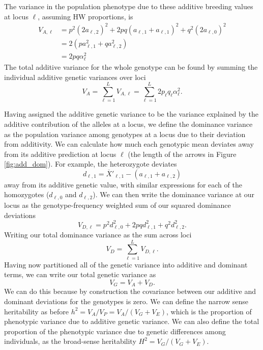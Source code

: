 The variance in the population phenotype due to these
additive breeding values at locus $\ell$, assuming HW proportions, is
\begin{align}
V_{A, \ell} &= p^2 (2a_{\ell,2})^2 + 2pq (a_{\ell,1}+a_{\ell,1})^2 + q^2
(2a_{\ell,0})^2 \nonumber \\
& = 2(p a_{\ell, 1}^2 + q a_{\ell, 2}^2 ) \nonumber \\
& = 2pq \alpha_{\ell}^2
\end{align}
The total additive variance for the whole genotype can
be found by summing the individual additive genetic variances over loci
\begin{equation}
V_A = \sum_{\ell=1}^{L} V_{A, \ell} = \sum_{\ell=1}^{L}
2p_{\ell}q_{\ell} \alpha_{\ell}^2.
\end{equation}

Having assigned the additive genetic variance to be the variance
explained by the additive contribution of the alleles at a locus, we
define the dominance variance as the population variance among
genotypes at a locus due to their deviation from additivity.
We can calculate how much each genotypic mean deviates away from its
additive prediction at locus $\ell$ (the length of the arrows in
Figure \ref{fig:add_dom}). For example, the heterozygote deviates 
\begin{equation}
d_{\ell,1} =\overline{X}'_{\ell,1}  - (a_{\ell,1}+ a_{\ell,2})
\end{equation}
away from its additive genetic value, with similar expressions for
each of the homozygotes ($d_{\ell,0}$ and $d_{\ell,2}$). We can then write the dominance variance at
our locus as the genotype-frequency weighted sum of our squared
dominance deviations
\begin{equation}
V_{D,\ell} = p^2 d_{\ell,0}^2+ 2pq d_{\ell,1}^2+ q^2 d_{\ell,2}^2.
\end{equation}
Writing our total dominance variance as the sum across loci 
\begin{equation}
V_D = \sum_{\ell=1}^{L}  V_{D,\ell}. 
\end{equation}
Having now partitioned all of the genetic variance into additive and
dominant terms, we can write our total genetic variance as 
\begin{equation}
V_{G} = V_A+V_D.
\end{equation}
We can do this because by construction the covariance between our
additive and dominant deviations for the genotypes is zero. We can
define the narrow sense heritability as before
$h^2=V_A/V_P=V_A/(V_G+V_E)$, which is the proportion of phenotypic
variance due to additive genetic variance. We can also define the 
total proportion of the phenotypic variance due to genetic differences
among individuals, as the broad-sense heritability $H^2 =
V_G/(V_G+V_E)$. \\

